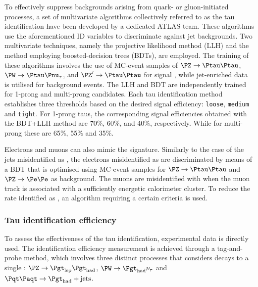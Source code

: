 To effectively suppress backgrounds arising from quark- or gluon-initiated processes, 
a set of multivariate algorithms collectively referred to as the tau identification have been 
developed by a dedicated ATLAS team. These algorithms use the aforementioned ID variables to
discriminate against jet backgrounds.
Two multivariate techniques, namely the projective likelihood method (LLH) and the method 
employing  boosted-decision trees (BDTs), are employed. The training of these algorithms involves the use of MC-event
samples of $\PZ \rightarrow \Ptau\Ptau$, $\PW \rightarrow \Ptau\Pnu_{\tau}$, and
$\PZ' \rightarrow \Ptau\Ptau$ for signal \tauhad, while jet-enriched data is utilised for 
background events.  The LLH and BDT are independently trained for 1-prong and multi-prong 
candidates. Each tau identification method establishes three thresholds based on the desired signal 
efficiency: \texttt{loose}, \texttt{medium} and \texttt{tight}. 
For 1-prong taus, the corresponding signal efficiencies obtained with the BDT+LLH method are
70\%, 60\%, and 40\%, respectively. While for multi-prong these are 65\%, 55\% and 35\%.

Electrons and muons can also mimic the \tauhad signature. Similarly to the 
case of the jets misidentified as \tauhad, the electrons misidentified as \tauhad are discriminated by means of a 
BDT that is optimised using MC-event samples for $\PZ \rightarrow \Ptau\Ptau$ and 
$\PZ \rightarrow \Pe\Pe$ as background. The muons are misidentified with \tauhad 
when the muon track is associated with a sufficiently energetic calorimeter cluster.
To reduce the rate \Pmu identified as \tauhad, an algorithm requiring a certain criteria is used.

\subsubsection{Tau identification efficiency}
To assess the effectiveness of the tau identification,
experimental data is directly used. The identification efficiency measurement
is achieved through a tag-and-probe method, which involves three distinct processes 
that considers decays to a single \tauhad:  $\PZ \rightarrow \taulep \tauhad$, 
$\PW \rightarrow \tauhad \nu_{\tau}$ and $\ttbar \rightarrow \tauhad + \text{jets}$.
 
